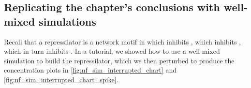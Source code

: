 \subsection{Replicating the chapter's conclusions with well-mixed simulations}

Recall that a repressilator is a network motif in which  inhibits , which inhibits , which in turn inhibits . In a tutorial, we showed how to use a well-mixed simulation to build the repressilator, which we then perturbed to produce the concentration plots in \autoref{fig:nf_sim_interrupted_chart} and \autoref{fig:nf_sim_interrupted_chart_spike}.\\

\begin{exercise}\end{exercise}

\newpage

\phantom{x}
\newpage
